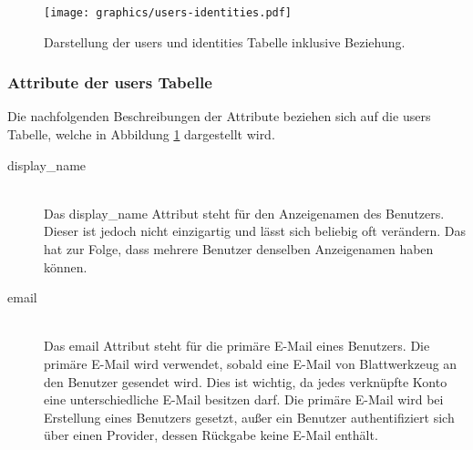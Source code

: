 \begin{figure}[h]
	\centering
	\texttt{[image: graphics/users-identities.pdf]}
	\caption{Darstellung der users und identities Tabelle inklusive Beziehung.}
	\label{fig:server-users-identities}
\end{figure}

\subsubsection*{Attribute der users Tabelle}
Die nachfolgenden Beschreibungen der Attribute beziehen sich auf die users Tabelle, welche in Abbildung \ref{fig:server-users-identities} dargestellt wird.
\begin{description}
	\item[display\_name]\hfill\\
	Das display\_name Attribut steht für den Anzeigenamen des Benutzers. Dieser ist jedoch nicht einzigartig und lässt sich beliebig oft verändern. Das hat zur Folge, dass mehrere Benutzer denselben Anzeigenamen haben können.
	\item[email]\hfill\\
	Das email Attribut steht für die primäre E-Mail eines Benutzers. Die primäre E-Mail wird verwendet, sobald eine E-Mail von Blattwerkzeug an den Benutzer gesendet wird. Dies ist wichtig, da jedes verknüpfte Konto eine unterschiedliche E-Mail besitzen darf. Die primäre E-Mail wird bei Erstellung eines Benutzers gesetzt, au{\ss}er ein Benutzer authentifiziert sich über einen Provider, dessen Rückgabe keine E-Mail enthält.
\end{description}


